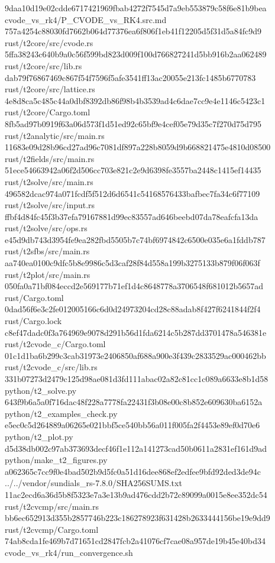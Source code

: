 \documentclass[
  10pt,
]{article}
\newenvironment{Shaded}{}{}
\newcommand{\NormalTok}[1]{#1}
\begin{document}
\begin{Shaded}
\begin{Highlighting}[]
\NormalTok{9daa10d19e02cdde6717421969fbab4272f7545d7a9eb553879c58f6e81b9bea  cvode\_vs\_rk4/P\_CVODE\_vs\_RK4.src.md}
\NormalTok{757a4254c88030fd7662b064d77376ea6f806f1eb41f12205d5f31d5a84fc9d9  rust/t2core/src/cvode.rs}
\NormalTok{5ffa38243c640b9a0c56f599bd823d009f100d766827241d5bb916b2aa062489  rust/t2core/src/lib.rs}
\NormalTok{dab79f76867469c867f54f7596f5afe3541ff13ac20055e213fc1485b6770783  rust/t2core/src/lattice.rs}
\NormalTok{4e8d8ca5c485c44a0dbf8392db86f98b4b3539ad4c6dae7cc9e4e1146c5423c1  rust/t2core/Cargo.toml}
\NormalTok{8fb5ad97b0919f63a06d573f1d51ed92c65bf9e4cef05e79d35c7f270d75d795  rust/t2analytic/src/main.rs}
\NormalTok{11683e09d28b96cd27ad96c7081df897a228b8059d9b668821475e4810d08500  rust/t2fields/src/main.rs}
\NormalTok{51ece54663942a06f2d506cc703e821c2e9d6398fe3557ba2448c1415ef14435  rust/t2solve/src/main.rs}
\NormalTok{496582dcac974a071fcdf5f512d6d6541c54168576433bafbec7fa34c6f77109  rust/t2solve/src/input.rs}
\NormalTok{ffbf4d84fc45f3b37efa79167881d99ec83557ad646beebd07da78eafcfa13da  rust/t2solve/src/ops.rs}
\NormalTok{e45d9db743d3954fe9ea282fbd5505b7c74bf6974842c6500e035e6a1fddb787  rust/t2sfbs/src/main.rs}
\NormalTok{aa740ea0100c9dfc5b8e9986c5d3caf28f84d558a199b3275133b879f06f063f  rust/t2plot/src/main.rs}
\NormalTok{050fa0a71bf084eccd2e569177b71ef1d4c8648778a3706548f681012b5657ad  rust/Cargo.toml}
\NormalTok{0dad56f6e3c2fe012005166c6d0d24973204cd28c88adab8f427f6241844f2f4  rust/Cargo.lock}
\NormalTok{c8ef47dadc0f3a764969e9078d291b56d1fda6214c5b287dd3701478a546381e  rust/t2cvode\_c/Cargo.toml}
\NormalTok{01c1d1ba6b299c3cab31973e2406850af688a900e3f439c2833529ac000462bb  rust/t2cvode\_c/src/lib.rs}
\NormalTok{331b07273d2479c125d98ae081d3fd111abac02a82c81cc1c089a6633e8b1d58  python/t2\_solve.py}
\NormalTok{643f9b6a5a0f716dac48f228a7778fa22431f3b08e00c8b852e609630ba6152a  python/t2\_examples\_check.py}
\NormalTok{e5ec0c5d264889a06265e021bbf5ce540bb56a011f005fa2f4453e89ef0d70e6  python/t2\_plot.py}
\NormalTok{d5d38db002c97ab373693decf46f1e112a141273cad50b0611a2831ef161d9ad  python/make\_t2\_figures.py}
\NormalTok{a062365c7cc9f0e4bad502b9d5fc0a51d16dee868ef2edfee9bfd92ded3de94c  ../../vendor/sundials\_rs{-}7.8.0/SHA256SUMS.txt}
\NormalTok{11ac2ecd6a36d5b8f5323e7a3e13b9ad476cdd2b72c89099a0015e8ee352dc54  rust/t2cvcmp/src/main.rs}
\NormalTok{bb6ec652913d355b2857746b223c186278923f631428b2633444156be19e9dd9  rust/t2cvcmp/Cargo.toml}
\NormalTok{74ab8cda1fe469b7d71651cd2847fcb2a41076cf7cae08a957de19b45e40bd34  cvode\_vs\_rk4/run\_convergence.sh}

\end{Highlighting}
\end{Shaded}
\end{document}
